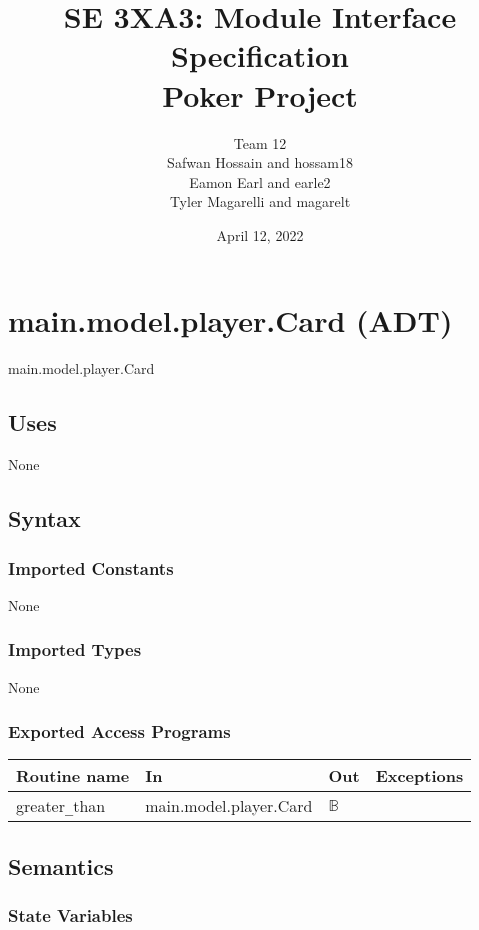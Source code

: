 \documentclass[12pt, titlepage]{article}
\title{SE 3XA3: Module Interface Specification \\Poker Project}
\author{Team 12
        \\ Safwan Hossain and hossam18
        \\ Eamon Earl and earle2
        \\ Tyler Magarelli and magarelt
}
\date{April 12, 2022}
\begin{document}
\maketitle



\section* {main.model.player.Card (ADT)}

main.model.player.Card

\subsection* {Uses}

None

\subsection* {Syntax}

\subsubsection* {Imported Constants}

None

\subsubsection* {Imported Types}

None

\subsubsection* {Exported Access Programs}

\begin{tabular}{| l | l | l | p{5cm} |}
\hline
\textbf{Routine name} & \textbf{In} & \textbf{Out} & \textbf{Exceptions}\\
\hline
greater\verb|_|than & main.model.player.Card & $\mathbb{B}$ &\\
\hline
\end{tabular}

\subsection* {Semantics}

\subsubsection* {State Variables}
\end{document}
